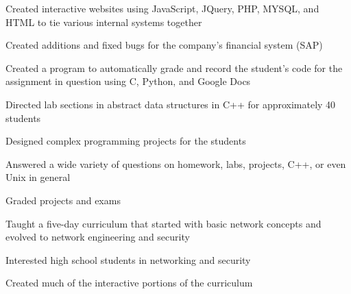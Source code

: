 \documentclass{resume}
\begin{document}
\begin{position}
  \item Created interactive websites using JavaScript, JQuery, PHP, MYSQL, and HTML to tie various internal systems together
  \item Created additions and fixed bugs for the company's financial system (SAP) 
\end{position}

\begin{position}
	\item Created a program to automatically grade and record the student's code for the assignment in question using C, Python, and Google Docs
	\item Directed lab sections in abstract data structures in C++ for approximately 40 students
	\item Designed complex programming projects for the students
	\item Answered a wide variety of questions on homework, labs, projects, C++, or even Unix in general
  \item Graded projects and exams
\end{position}


\begin{position}
	\item Taught a five-day curriculum that started with basic network concepts and evolved to network engineering and security
	\item Interested high school students in networking and security
	\item Created much of the interactive portions of the curriculum
\end{position}
\end{document}
